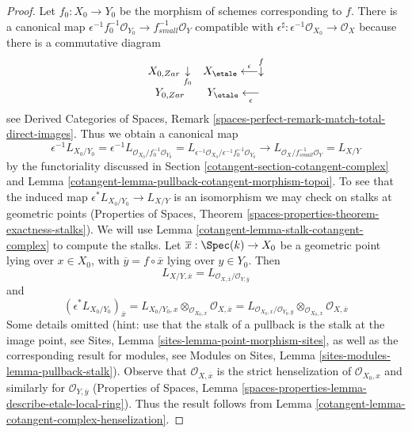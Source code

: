 \begin{proof}

Let $f_0 : X_0 \to Y_0$ be the morphism of schemes corresponding to $f$.
There is a canonical map
$\epsilon^{-1}f_0^{-1}\mathcal{O}_{Y_0} \to f_{small}^{-1}\mathcal{O}_Y$
compatible with
$\epsilon^\sharp : \epsilon^{-1}\mathcal{O}_{X_0} \to \mathcal{O}_X$
because there is a commutative diagram
$$
\begin{array}{cc}X_{0, Zar} \underset{f_0}{\downarrow} & X_\etale \overset{\epsilon}{\longleftarrow}\overset{f}{\downarrow} \\ Y_{0, Zar} & Y_\etale \underset{\epsilon}{\longleftarrow}\end{array}
$$
see Derived Categories of Spaces, Remark
\ref{spaces-perfect-remark-match-total-direct-images}.
Thus we obtain a canonical map
$$
\epsilon^{-1}L_{X_0/Y_0} =
\epsilon^{-1}L_{\mathcal{O}_{X_0}/f_0^{-1}\mathcal{O}_{Y_0}} =
L_{\epsilon^{-1}\mathcal{O}_{X_0}/\epsilon^{-1}f_0^{-1}\mathcal{O}_{Y_0}}
\longrightarrow
L_{\mathcal{O}_X/f^{-1}_{small}\mathcal{O}_Y} = L_{X/Y}
$$
by the functoriality discussed in Section \ref{cotangent-section-cotangent-complex}
and Lemma \ref{cotangent-lemma-pullback-cotangent-morphism-topoi}.
To see that the induced map $\epsilon^*L_{X_0/Y_0} \to L_{X/Y}$ is an
isomorphism we may check on stalks at geometric points
(Properties of Spaces, Theorem
\ref{spaces-properties-theorem-exactness-stalks}).
We will use Lemma \ref{cotangent-lemma-stalk-cotangent-complex}
to compute the stalks. Let $\overline{x} : \Spec(k) \to X_0$
be a geometric point lying over $x \in X_0$, with
$\overline{y} = f \circ \overline{x}$ lying over $y \in Y_0$. Then
$$
L_{X/Y, \overline{x}} =
L_{\mathcal{O}_{X, \overline{x}}/\mathcal{O}_{Y, \overline{y}}}
$$
and
$$
(\epsilon^*L_{X_0/Y_0})_{\overline{x}} =
L_{X_0/Y_0, x} \otimes_{\mathcal{O}_{X_0, x}}
\mathcal{O}_{X, \overline{x}} =
L_{\mathcal{O}_{X_0, x}/\mathcal{O}_{Y_0, y}}
\otimes_{\mathcal{O}_{X_0, x}} \mathcal{O}_{X, \overline{x}}
$$
Some details omitted (hint: use that the stalk of a pullback
is the stalk at the image point, see
Sites, Lemma \ref{sites-lemma-point-morphism-sites},
as well as the corresponding result for modules, see
Modules on Sites, Lemma \ref{sites-modules-lemma-pullback-stalk}).
Observe that $\mathcal{O}_{X, \overline{x}}$ is the strict
henselization of $\mathcal{O}_{X_0, x}$ and similarly
for $\mathcal{O}_{Y, \overline{y}}$
(Properties of Spaces, Lemma
\ref{spaces-properties-lemma-describe-etale-local-ring}).
Thus the result follows from
Lemma \ref{cotangent-lemma-cotangent-complex-henselization}.
\end{proof}

